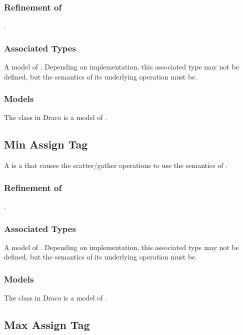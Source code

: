 \documentclass[11pt]{rnote}
\begin{document}
\subsubsection{Refinement of}
.

\subsubsection{Associated Types}

A model of . Depending on implementation, this
associated type may not be defined, but the semantics of its
underlying operation must be.

\subsubsection{Models}

The  class in Draco is a model of
.

\subsection{Min Assign Tag}

A  is a  that
causes the  scatter/gather operations to use the semantics
of .

\subsubsection{Refinement of}
.

\subsubsection{Associated Types}

A model of . Depending on implementation, this
associated type may not be defined, but the semantics of its
underlying operation must be.

\subsubsection{Models}

The  class in Draco is a model of
.

\subsection{Max Assign Tag}
\end{document}
